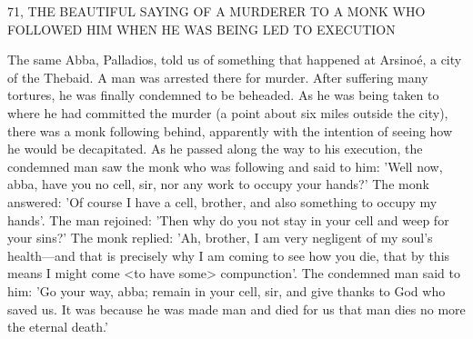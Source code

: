 71, THE BEAUTIFUL SAYING OF A MURDERER
TO A MONK WHO FOLLOWED HIM
WHEN HE WAS BEING LED TO EXECUTION

The same Abba, Palladios, told us of something that happened at
Arsinoé, a city of the Thebaid.
A man was arrested there for
murder.
After suffering many tortures, he was finally condemned to
be beheaded.
As he was being taken to where he had committed the
murder (a point about six miles outside the city), there was a monk
following behind, apparently with the intention of seeing how he
would be decapitated.
As he passed along the way to his execution,
the condemned man saw the monk who was following and said to
him: 'Well now, abba, have you no cell, sir, nor any work to occupy
your hands?' The monk answered: 'Of course I have a cell, brother,
and also something to occupy my hands'.
The man rejoined: 'Then
why do you not stay in your cell and weep for your sins?' The
monk replied: 'Ah, brother, I am very negligent of my soul's
health—and that is precisely why I am coming to see how you die,
that by this means I might come <to have some> compunction'.
The condemned man said to him: 'Go your way, abba; remain in
your cell, sir, and give thanks to God who saved us.
It was because
he was made man and died for us that man dies no more the eternal
death.'

